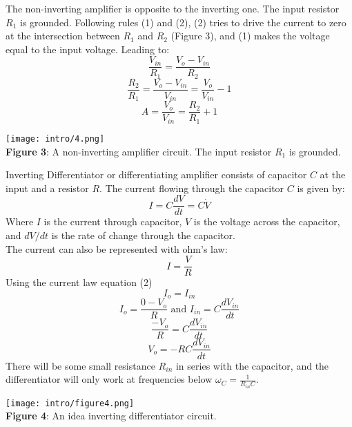 \documentclass[11pt]{article}
\begin{document}
The non-inverting amplifier is opposite to the inverting one. The input resistor $R_1$ is grounded. Following rules (1) and (2), (2) tries to drive the current to zero at the intersection between $R_1$ and $R_2$ (Figure 3), and (1) makes the voltage equal to the input voltage. Leading to:
\begin{equation}
    \frac{V_{in}}{R_1}=\frac{V_{o}-V_{in}}{R_2}
\end{equation}
\begin{equation}
    \frac{R_2}{R_1}=\frac{V_{o}-V_{in}}{V_{in}}=\frac{V_{o}}{V_{in}}-1
\end{equation}
\begin{equation}
    A=\frac{V_{o}}{V_{in}}=\frac{R_2}{R_1}+1
\end{equation}
\begin{center}
    \texttt{[image: intro/4.png]}\\\textbf{Figure 3}: A non-inverting amplifier circuit. The input resistor $R_1$ is grounded.
\end{center}
Inverting Differentiator or differentiating amplifier consists of capacitor $C$ at the input and a resistor $R$. The current flowing through the capacitor $C$ is given by:
\begin{equation}
    I=C\frac{dV}{dt}=C\dot V
\end{equation}
Where $I$ is the current through capacitor, $V$ is the voltage across the capacitor, and $dV/dt$ is the rate of change through the capacitor.\\
The current can also be represented with ohm's law:
\begin{equation}
    I=\frac{V}{R}
\end{equation}
Using the current law equation (2)
\begin{equation}
    I_o=I_{in}
\end{equation}
\begin{equation}
    I_o=\frac{0-V_o}{R} \text{ and } I_{in}=C\frac{dV_{in}}{dt}
\end{equation}
\begin{equation}
    \frac{-V_o}{R}=C\frac{dV_{in}}{dt}
\end{equation}
\begin{equation}
    V_o=-RC\frac{dV_{in}}{dt}
\end{equation}
There will be some small resistance $R_{in}$ in series with the capacitor, and the differentiator will only work at frequencies below $\omega_C=\frac{1}{R_{in}C}$.
\begin{center}
    \texttt{[image: intro/figure4.png]}\\\textbf{Figure 4}: An idea inverting differentiator circuit.
\end{center}
\end{document}
